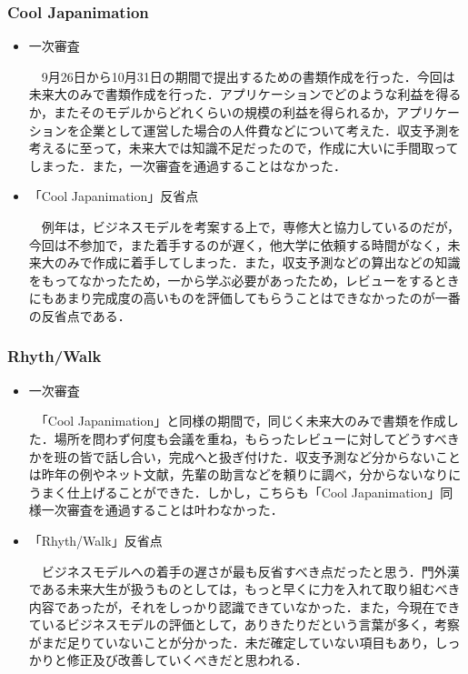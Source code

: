 \subsubsection{Cool Japanimation}
\par
\begin{itemize}
\item 一次審査
\par
　9月26日から10月31日の期間で提出するための書類作成を行った．今回は未来大のみで書類作成を行った．アプリケーションでどのような利益を得るか，またそのモデルからどれくらいの規模の利益を得られるか，アプリケーションを企業として運営した場合の人件費などについて考えた．収支予測を考えるに至って，未来大では知識不足だったので，作成に大いに手間取ってしまった．また，一次審査を通過することはなかった．
\par
\item 「Cool Japanimation」反省点
\par
　例年は，ビジネスモデルを考案する上で，専修大と協力しているのだが，今回は不参加で，また着手するのが遅く，他大学に依頼する時間がなく，未来大のみで作成に着手してしまった．また，収支予測などの算出などの知識をもってなかったため，一から学ぶ必要があったため，レビューをするときにもあまり完成度の高いものを評価してもらうことはできなかったのが一番の反省点である．
\end{itemize}
\subsubsection{Rhyth/Walk}
\begin{itemize}
\item 一次審査
\par
　「Cool Japanimation」と同様の期間で，同じく未来大のみで書類を作成した．場所を問わず何度も会議を重ね，もらったレビューに対してどうすべきかを班の皆で話し合い，完成へと扱ぎ付けた．収支予測など分からないことは昨年の例やネット文献，先輩の助言などを頼りに調べ，分からないなりにうまく仕上げることができた．しかし，こちらも「Cool Japanimation」同様一次審査を通過することは叶わなかった．
\item 「Rhyth/Walk」反省点
\par
　ビジネスモデルへの着手の遅さが最も反省すべき点だったと思う．門外漢である未来大生が扱うものとしては，もっと早くに力を入れて取り組むべき内容であったが，それをしっかり認識できていなかった．また，今現在できているビジネスモデルの評価として，ありきたりだという言葉が多く，考察がまだ足りていないことが分かった．未だ確定していない項目もあり，しっかりと修正及び改善していくべきだと思われる．
\end{itemize}
